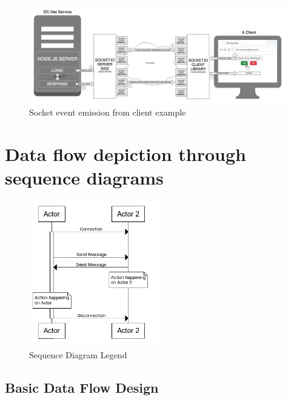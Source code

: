 \begin{figure}[H]
    \centering
    \includegraphics[width=1\textwidth]{Images/Design/singleClientSocketEvent.png}
    \caption{Socket event emission from client example}
    \label{fig:socketEventEmission}
\end{figure}



\section{Data flow depiction through sequence diagrams}


\begin{figure}[H]
    \centering
    \includegraphics[width=0.5\textwidth]{Images/Design/seqDiagramLegend.png}
    \caption{Sequence Diagram Legend}
    \label{fig:sequenceDiagramLegend}
\end{figure}


\subsection{Basic Data Flow Design}

